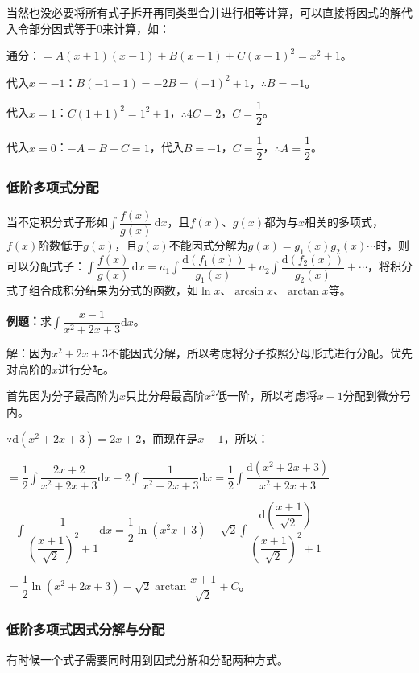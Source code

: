 \documentclass[UTF8, 12pt]{ctexart}
\begin{document}
当然也没必要将所有式子拆开再同类型合并进行相等计算，可以直接将因式的解代入令部分因式等于0来计算，如：

通分：$=A(x+1)(x-1)+B(x-1)+C(x+1)^2=x^2+1$。

代入$x=-1$：$B(-1-1)=-2B=(-1)^2+1$，$\therefore B=-1$。

代入$x=1$：$C(1+1)^2=1^2+1$，$\therefore4C=2$，$C=\dfrac{1}{2}$。

代入$x=0$：$-A-B+C=1$，代入$B=-1$，$C=\dfrac{1}{2}$，$\therefore A=\dfrac{1}{2}$。

\subsubsection{低阶多项式分配}

当不定积分式子形如$\displaystyle{\int\dfrac{f(x)}{g(x)}\,\textrm{d}x}$，且$f(x)$、$g(x)$都为与$x$相关的多项式，$f(x)$阶数低于$g(x)$，且$g(x)$不能因式分解为$g(x)=g_1(x)g_2(x)\cdots$时，则可以分配式子：$\displaystyle{\int\dfrac{f(x)}{g(x)}\,\textrm{d}x=a_1\int\dfrac{\textrm{d}(f_1(x))}{g_1(x)}+a_2\int\dfrac{\textrm{d}(f_2(x))}{g_2(x)}}+\cdots$，将积分式子组合成积分结果为分式的函数，如$\ln x$、$\arcsin x$、$\arctan x$等。

\textbf{例题：}求$\displaystyle{\int\dfrac{x-1}{x^2+2x+3}\textrm{d}x}$。

解：因为$x^2+2x+3$不能因式分解，所以考虑将分子按照分母形式进行分配。优先对高阶的$x$进行分配。

首先因为分子最高阶为$x$只比分母最高阶$x^2$低一阶，所以考虑将$x-1$分配到微分号内。

$\because\textrm{d}(x^2+2x+3)=2x+2$，而现在是$x-1$，所以：

$=\displaystyle{\dfrac{1}{2}\int\dfrac{2x+2}{x^2+2x+3}\textrm{d}x-2\int\dfrac{1}{x^2+2x+3}\textrm{d}x}=\displaystyle{\dfrac{1}{2}\int\dfrac{\textrm{d}(x^2+2x+3)}{x^2+2x+3}}$

$-\displaystyle{\int\dfrac{1}{\left(\dfrac{x+1}{\sqrt{2}}\right)^2+1}\textrm{d}x}=\displaystyle{\dfrac{1}{2}\ln(x^2x+3)-\sqrt{2}\int\dfrac{\textrm{d}\left(\dfrac{x+1}{\sqrt{2}}\right)}{\left(\dfrac{x+1}{\sqrt{2}}\right)^2+1}}$

$=\dfrac{1}{2}\ln(x^2+2x+3)-\sqrt{2}\arctan\dfrac{x+1}{\sqrt{2}}+C$。

\subsubsection{低阶多项式因式分解与分配}

有时候一个式子需要同时用到因式分解和分配两种方式。
\end{document}
